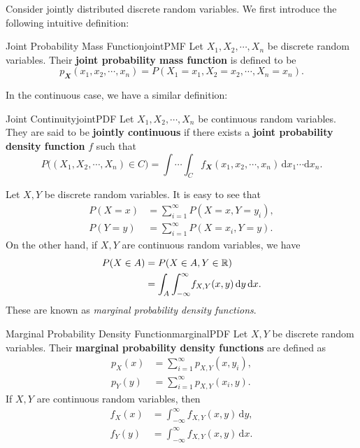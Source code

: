 \documentclass[math]{amznotes}
\theoremstyle{remark}
\begin{document}
Consider jointly distributed discrete random variables. We first introduce the following intuitive definition:
\begin{dfnbox}{Joint Probability Mass Function}{jointPMF}
    Let $X_1, X_2, \cdots, X_n$ be discrete random variables. Their {\color{red} \textbf{joint probability mass function}} is defined to be
    \begin{equation*}
        p_{\mathbfit{X}}(x_1, x_2, \cdots, x_n) = P(X_1 = x_1, X_2 = x_2, \cdots, X_n = x_n).
    \end{equation*}
\end{dfnbox} 
In the continuous case, we have a similar definition:
\begin{dfnbox}{Joint Continuity}{jointPDF}
    Let $X_1, X_2, \cdots, X_n$ be continuous random variables. They are said to be {\color{red} \textbf{jointly continuous}} if there exists a {\color{red} \textbf{joint probability density function}} $f$ such that
    \begin{equation*}
        P\bigl((X_1, X_2, \cdots, X_n) \in C\bigr) = \int\cdots\int_{C}\!f_{\mathbfit{X}}(x_1, x_2, \cdots, x_n)\,\mathrm{d}x_1\cdots\mathrm{d}x_n.
    \end{equation*}
\end{dfnbox}
Let $X, Y$ be discrete random variables. It is easy to see that
\begin{align*}
    P(X = x) & = \sum_{i = 1}^{\infty}P(X = x, Y = y_i), \\
    P(Y = y) & = \sum_{i = 1}^{\infty}P(X = x_i, Y = y).
\end{align*}
On the other hand, if $X, Y$ are continuous random variables, we have
\begin{align*}
    P(X \in A) & = P(X \in A, Y \in \mathbb{R}) \\
    & = \int_{A}\int_{-\infty}^{\infty}\!f_{X, Y}(x, y)\,\mathrm{d}y\,\mathrm{d}x.
\end{align*}
These are known as \textit{marginal probability density functions}.
\begin{dfnbox}{Marginal Probability Density Function}{marginalPDF}
    Let $X, Y$ be discrete random variables. Their {\color{red} \textbf{marginal probability density functions}} are defined as
    \begin{align*}
        p_X(x) & = \sum_{i = 1}^{\infty}p_{X, Y}(x, y_i), \\
        p_Y(y) & = \sum_{i = 1}^{\infty}p_{X, Y}(x_i, y).
    \end{align*}
    If $X, Y$ are continuous random variables, then
    \begin{align*}
        f_X(x) & = \int_{-\infty}^{\infty}\!f_{X, Y}(x, y)\,\mathrm{d}y, \\
        f_Y(y) & = \int_{-\infty}^{\infty}\!f_{X, Y}(x, y)\,\mathrm{d}x.
    \end{align*}
\end{dfnbox}
\end{document}
